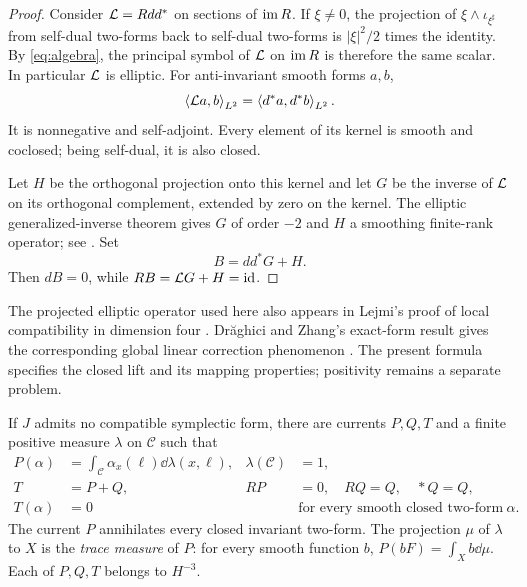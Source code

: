 \begin{proof}
Consider \(\mathcal L=Rdd^*\) on sections of \(\operatorname{im} R\). If \(\xi\ne0\),
the projection of
\(\xi\wedge\iota_{\xi^\sharp}\) from self-dual two-forms back to
self-dual two-forms is \(|\xi|^2/2\) times the identity.
By \eqref{eq:algebra}, the principal symbol of \(\mathcal L\) on
\(\operatorname{im} R\) is therefore the same scalar. In particular \(\mathcal L\)
is elliptic. For anti-invariant smooth forms \(a,b\),
\[
\left\langle \mathcal L a,b\right\rangle_{L^2}=\left\langle d^*a,d^*b\right\rangle_{L^2}.
\]
It is nonnegative and self-adjoint. Every element of its kernel
is smooth and coclosed; being self-dual, it is also closed.

Let \(H\) be the orthogonal projection onto this kernel and let
\(G\) be the inverse of \(\mathcal L\) on its orthogonal complement,
extended by zero on the kernel. The elliptic generalized-inverse
theorem gives \(G\) of order \(-2\) and \(H\) a smoothing
finite-rank operator; see
\cite[Proposition~6.4 and Theorem~6.3]{MelroseIML}.
Set
\[
B=dd^*G+H.
\]
Then \(dB=0\), while \(RB=\mathcal L G+H=\mathrm{id}\).
\end{proof}

The projected elliptic operator used here also appears in Lejmi's
proof of local compatibility in dimension four
\cite[proof of Theorem~1]{Lejmi2006}.
Dr\u{a}ghici and Zhang's exact-form result gives the corresponding
global linear correction phenomenon
\cite[Proposition~3.1]{DraghiciZhang2012}.
The present formula specifies the closed lift and its mapping properties;
positivity remains a separate problem.

\begin{proposition}\label{prop:separation}
If \(J\) admits no compatible symplectic form, there are currents
\(P,Q,T\) and a finite positive measure \(\lambda\) on
\(\mathscr C\) such that
\begin{align}
P(\alpha)&=\int_{\mathscr C}\alpha_x(\ell)\dd\lambda(x,\ell),
&\lambda(\mathscr C)&=1,\label{eq:positive-representation}\\
T&=P+Q,
&RP&=0,\quad RQ=Q,\quad *Q=Q,\label{eq:decomposition}\\
T(\alpha)&=0&&\text{for every smooth closed two-form }\alpha.
\label{eq:annihilation}
\end{align}
The current \(P\) annihilates every closed invariant two-form.
The projection \(\mu\) of \(\lambda\) to \(X\) is the
\emph{trace measure} of \(P\): for every smooth function \(b\),
\(P(bF)=\int_Xb\dd\mu\). Each of \(P,Q,T\) belongs to \(H^{-3}\).
\end{proposition}


